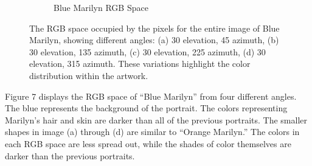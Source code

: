 \documentclass{article}
\begin{document}
\begin{figure}[ht]
\begin{subfigure}{0.45\textwidth}
    \caption{Blue Marilyn RGB Space}
    \label{fig:4_16_blue_marilyn_original_scatter}
  \end{subfigure}
  \caption{The RGB space occupied by the pixels for the entire image of Blue Marilyn, showing different angles: (a) 30 \degree elevation, 45 \degree azimuth, (b) 30 \degree elevation, 135 \degree azimuth, (c) 30 \degree elevation, 225 \degree azimuth, (d) 30 \degree elevation, 315 \degree azimuth. These variations highlight the color distribution within the artwork.}
  \label{fig:blue_marilyn_original_scatter_2}
\end{figure}

Figure 7 displays the RGB space of ``Blue Marilyn'' from four different
angles. The blue represents the background of the portrait. The colors
representing Marilyn's hair and skin are darker than all of the previous
portraits. The smaller shapes in image (a) through (d) are similar to
``Orange Marilyn.'' The colors in each RGB space are less spread out,
while the shades of color themselves are darker than the previous
portraits.
\end{document}
